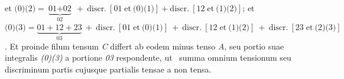 et
\newline%
\hspace*{7,8mm}%
$\textit{(0)(2)} = \underbrace{\textit{01} + \textit{02}}_{\displaystyle\textit{02}}\: +\: \text{discr.}\: [\textit{01}\; \text{et}\: \textit{(0)(1)}] + \text{discr.}\: [\textit{12}\; \text{et}\: \textit{(1)(2)}]$;%
et
\newline%
\hspace*{7,8mm}%
$\textit{(0)(3)} = \underbrace{\textit{01} + \textit{12} + \textit{23}}_{\displaystyle\textit{03}}\: +\: \text{discr.}\: [\textit{01}\; \text{et}\: \textit{(0)(1)}]\: +\: \text{discr.}\: [\textit{12}\; \text{et}\: \textit{(1)(2)}]\: +\: \text{discr.}\: [\textit{23}\; \text{et}\: \textit{(2)(3)}]$.%
\newline%
Et proinde filum tensum \textit{C}
differt%
%
ab eodem minus tenso \textit{A},
seu portio suae integralis \textit{(0)(3)}%
a portione \textit{03} respondente,
\lbrack ut\rbrack\ %
summa omnium tensionum%
%
seu discriminum%
%
partis cujusque partialis tensae%
a non tensa.%
